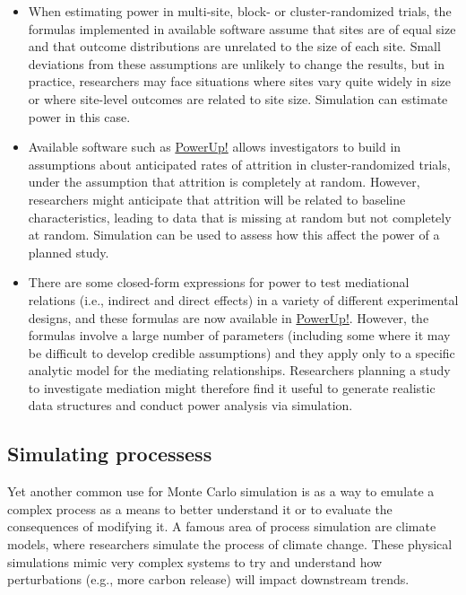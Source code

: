 \documentclass[
]{book}
\begin{document}
\begin{itemize}
\item
  When estimating power in multi-site, block- or cluster-randomized trials, the formulas implemented in available software assume that sites are of equal size and that outcome distributions are unrelated to the size of each site.
  Small deviations from these assumptions are unlikely to change the results, but in practice, researchers may face situations where sites vary quite widely in size or where site-level outcomes are related to site size.
  Simulation can estimate power in this case.
\item
  Available software such as \href{https://www.causalevaluation.org/power-analysis.html}{PowerUp!} allows investigators to build in assumptions about anticipated rates of attrition in cluster-randomized trials, under the assumption that attrition is completely at random.
  However, researchers might anticipate that attrition will be related to baseline characteristics, leading to data that is missing at random but not completely at random.
  Simulation can be used to assess how this affect the power of a planned study.
\item
  There are some closed-form expressions for power to test mediational relations (i.e., indirect and direct effects) in a variety of different experimental designs, and these formulas are now available in \href{https://www.causalevaluation.org/power-analysis.html}{PowerUp!}.
  However, the formulas involve a large number of parameters (including some where it may be difficult to develop credible assumptions) and they apply only to a specific analytic model for the mediating relationships.
  Researchers planning a study to investigate mediation might therefore find it useful to generate realistic data structures and conduct power analysis via simulation.
\end{itemize}

\subsection{Simulating processess}\label{simulating-processess}

Yet another common use for Monte Carlo simulation is as a way to emulate a complex process as a means to better understand it or to evaluate the consequences of modifying it.
A famous area of process simulation are climate models, where researchers simulate the process of climate change.
These physical simulations mimic very complex systems to try and understand how perturbations (e.g., more carbon release) will impact downstream trends.
\end{document}
